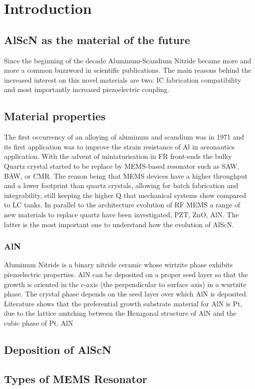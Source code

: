 \cleardoublepage
\chapter{Introduction}

\section{AlScN as the material of the future}
Since the beginning of the decade Aluminum-Scandium Nitride became more and more a common buzzword in scientific publications. The main reasons behind the increased interest on this novel materials are two: IC fabrication compatibility and most importantly increased piezoelectric coupling. 


\section{Material properties }
The first occurrency of an alloying of aluminum and scandium was in 1971 \cite{caro_piezoelectric_2015} and its first application was to improve the strain resistance of Al in aeronautics application. With the advent of miniaturisation in FR front-ends the bulky Quartz crystal started to be replace by MEMS-based resonator such as SAW, BAW, or CMR. The reason being that MEMS devices have a higher throughput and a lower footprint than quartz crystals, allowing for batch fabrication and integrability, still keeping the higher Q that mechanical systems show compared to LC tanks. In parallel to the architecture evolution of RF MEMS a range of new materials to replace quartz have been investigated, PZT, ZnO, AlN. The latter is the most important one to understand how the evolution of AlScN.
\subsection{AlN}
Aluminum Nitride is a binary nitride ceramic whose wirtzite phase exhibits piezoelectric properties. AlN can be deposited on a proper seed layer so that the growth is oriented in the c-axis (the perpendicular to surface axis) in a wurtzite phase. The crystal phase depends on the seed layer over which AlN is deposited. Literature \cite{xiong_influence_2010} shows that the preferential growth substrate material for AlN is Pt, due to the lattice amtching between the Hexagonal structure of AlN and the cubic phase of Pt. AlN  

\section{Deposition of AlScN}
\section{Types of MEMS Resonator}

